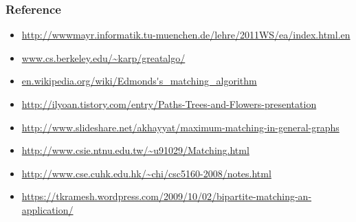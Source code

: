 \documentclass[hyperref={pdfpagelabels=false}]{beamer}
\begin{document}
{\begin{center}
	\end{center}
	
}

\frame
{
	\frametitle{Reference}
		
	\begin{itemize}
		\item \url{http://wwwmayr.informatik.tu-muenchen.de/lehre/2011WS/ea/index.html.en}
		\item \url{www.cs.berkeley.edu/~karp/greatalgo/}
		\item \url{en.wikipedia.org/wiki/Edmonds's_matching_algorithm}
		\item \url{http://ilyoan.tistory.com/entry/Paths-Trees-and-Flowers-presentation}
		\item \url{http://www.slideshare.net/akhayyat/maximum-matching-in-general-graphs}
		\item \url{http://www.csie.ntnu.edu.tw/~u91029/Matching.html}
		\item \url{http://www.cse.cuhk.edu.hk/~chi/csc5160-2008/notes.html}
		\item \url{https://tkramesh.wordpress.com/2009/10/02/bipartite-matching-an-application/}
	\end{itemize}

}
\end{document}
